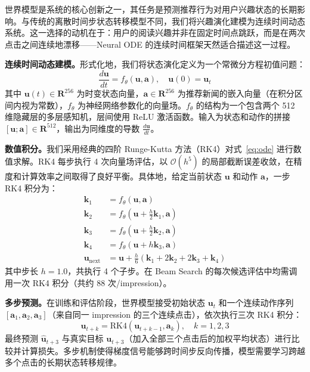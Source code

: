 \documentclass[twocolumn,10pt,a4paper]{ctexart}
\begin{document}
世界模型是系统的核心创新之一，其任务是预测推荐行为对用户兴趣状态的长期影响。与传统的离散时间步状态转移模型不同，我们将兴趣演化建模为连续时间动态系统。这一选择的动机在于：用户的阅读兴趣并非在固定时间点跳跃，而是在两次点击之间连续地漂移——Neural ODE 的连续时间框架天然适合描述这一过程。

\textbf{连续时间动态建模。}形式化地，我们将状态演化定义为一个常微分方程初值问题：
\begin{equation}
\frac{d\mathbf{u}}{dt} = f_\theta(\mathbf{u}, \mathbf{a}), \quad \mathbf{u}(0) = \mathbf{u}_t
\label{eq:ode}
\end{equation}
其中 $\mathbf{u}(t) \in \mathbf{R}^{256}$ 为时变状态向量，$\mathbf{a} \in \mathbf{R}^{256}$ 为推荐新闻的嵌入向量（在积分区间内视为常数），$f_\theta$ 为神经网络参数化的向量场。$f_\theta$ 的结构为一个包含两个 512 维隐藏层的多层感知机，层间使用 ReLU 激活函数。输入为状态和动作的拼接 $[\mathbf{u}; \mathbf{a}] \in \mathbf{R}^{512}$，输出为同维度的导数 $\frac{d\mathbf{u}}{dt}$。

\textbf{数值积分。}我们采用经典的四阶 Runge-Kutta 方法（RK4）对式~\eqref{eq:ode} 进行数值求解。RK4 每步执行 4 次向量场评估，以 $\mathcal{O}(h^5)$ 的局部截断误差收敛，在精度和计算效率之间取得了良好平衡。具体地，给定当前状态 $\mathbf{u}$ 和动作 $\mathbf{a}$，一步 RK4 积分为：
\begin{equation}
\begin{aligned}
\mathbf{k}_1 &= f_\theta(\mathbf{u}, \mathbf{a}) \\
\mathbf{k}_2 &= f_\theta(\mathbf{u} + \tfrac{h}{2}\mathbf{k}_1, \mathbf{a}) \\
\mathbf{k}_3 &= f_\theta(\mathbf{u} + \tfrac{h}{2}\mathbf{k}_2, \mathbf{a}) \\
\mathbf{k}_4 &= f_\theta(\mathbf{u} + h\mathbf{k}_3, \mathbf{a}) \\
\mathbf{u}_{\text{next}} &= \mathbf{u} + \tfrac{h}{6}(\mathbf{k}_1 + 2\mathbf{k}_2 + 2\mathbf{k}_3 + \mathbf{k}_4)
\end{aligned}
\label{eq:rk4}
\end{equation}
其中步长 $h=1.0$，共执行 4 个子步。在 Beam Search 的每次候选评估中均需调用一次 RK4 积分（共约 88 次/impression）。

\textbf{多步预测。}在训练和评估阶段，世界模型接受初始状态 $\mathbf{u}_t$ 和一个连续动作序列 $[\mathbf{a}_1, \mathbf{a}_2, \mathbf{a}_3]$（来自同一 impression 的三个连续点击），依次执行三次 RK4 积分：
\begin{equation}
\mathbf{u}_{t+k} = \text{RK4}(\mathbf{u}_{t+k-1}, \mathbf{a}_k), \quad k = 1, 2, 3
\label{eq:multistep}
\end{equation}
最终预测 $\hat{\mathbf{u}}_{t+3}$ 与真实目标 $\mathbf{u}_{t+3}$（加入全部三个点击后的加权平均状态）进行比较并计算损失。多步机制使得梯度信号能够跨时间步反向传播，模型需要学习跨越多个点击的长期状态转移规律。
\end{document}
